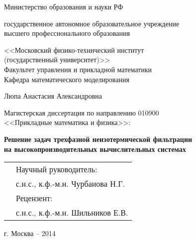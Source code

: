 \begin{titlepage}
\begin{center}
{Министерство образования и науки РФ} \\
\vspace{7mm}
{ государственное автономное образовательное учреждение \\
высшего профессионального образования\par}
\vspace{1.5mm}
{<<Московский физико-технический институт \\
(государственный университет)>>} \\
\vspace{1.5mm}
Факультет управления и прикладной математики \\
Кафедра математического моделирования \par
\vspace{40mm}
{Люпа Анастасия Александровна\par}
\vspace{10mm}
{Магистерская диссертация по направлению 010900 \\
<<Прикладные математика и физика>>:\par}

\vspace{10mm}

{\bf \large Решение задач трехфазной неизотермической фильтрации \\
на высокопроизводительных вычислительных системах\par}

\end{center}

\vspace{40mm}
\begin{flushright}
  \begin{tabularx}{\textwidth}{XX}
    &Научный руководитель: \\
    &с.н.с., к.ф.-м.н. Чурбанова Н.Г. \\
    &Рецензент: \\
    &с.н.с., к.ф.-м.н. Шильников Е.В.
  \end{tabularx}
\end{flushright}
 
\vspace{\fill}

\begin{center}
{г. Москва -- 2014}
\end{center}

\clearpage
\end{titlepage}
\newpage